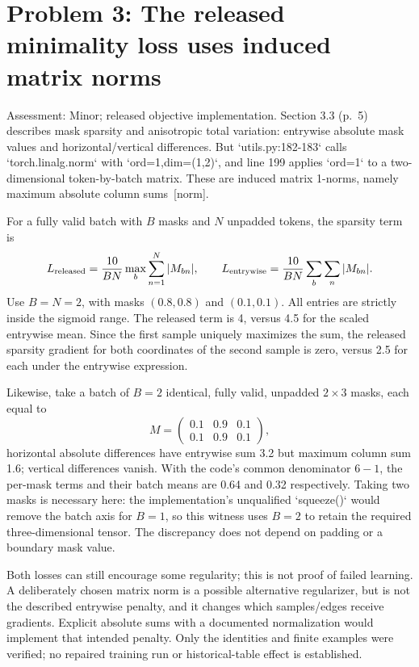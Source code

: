\documentclass[10pt]{article}
\begin{document}
\section*{Problem 3: The released minimality loss uses induced matrix norms}
Assessment: Minor; released objective implementation. Section 3.3 (p. 5) describes mask sparsity and anisotropic total variation: entrywise absolute mask values and horizontal/vertical differences. But `utils.py:182-183` calls `torch.linalg.norm` with `ord=1,dim=(1,2)`, and line 199 applies `ord=1` to a two-dimensional token-by-batch matrix. These are induced matrix 1-norms, namely maximum absolute column sums [norm].\par
For a fully valid batch with \(B\) masks and \(N\) unpadded tokens, the sparsity term is \[L_{\rm released}=\frac{10}{BN}\max_b\sum_{n=1}^{N}|M_{bn}|,
 \qquad
 L_{\rm entrywise}=\frac{10}{BN}\sum_b\sum_n|M_{bn}|.\] Use \(B=N=2\), with masks \((0.8,0.8)\) and \((0.1,0.1)\). All entries are strictly inside the sigmoid range. The released term is 4, versus 4.5 for the scaled entrywise mean. Since the first sample uniquely maximizes the sum, the released sparsity gradient for both coordinates of the second sample is zero, versus 2.5 for each under the entrywise expression.\par
Likewise, take a batch of \(B=2\) identical, fully valid, unpadded \(2\times3\) masks, each equal to \[M=\begin{pmatrix}0.1&0.9&0.1\\0.1&0.9&0.1\end{pmatrix},\] horizontal absolute differences have entrywise sum 3.2 but maximum column sum 1.6; vertical differences vanish. With the code’s common denominator \(6-1\), the per-mask terms and their batch means are 0.64 and 0.32 respectively. Taking two masks is necessary here: the implementation’s unqualified `squeeze()` would remove the batch axis for \(B=1\), so this witness uses \(B=2\) to retain the required three-dimensional tensor. The discrepancy does not depend on padding or a boundary mask value.\par
Both losses can still encourage some regularity; this is not proof of failed learning. A deliberately chosen matrix norm is a possible alternative regularizer, but is not the described entrywise penalty, and it changes which samples/edges receive gradients. Explicit absolute sums with a documented normalization would implement that intended penalty. Only the identities and finite examples were verified; no repaired training run or historical-table effect is established.\par
\end{document}
